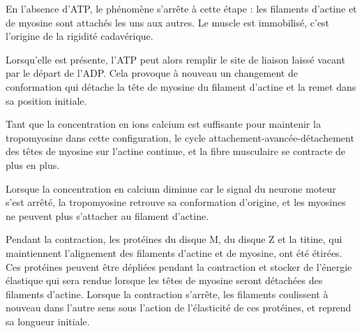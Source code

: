 En l'absence d'ATP, le phénomène s'arrête à cette étape : les filaments d'actine et de myosine sont attachés les uns aux autres. Le muscle est immobilisé, c'est l'origine de la rigidité cadavérique. 

Lorsqu'elle est présente, l'ATP peut alors remplir le site de liaison laissé vacant par le départ de l'ADP. Cela provoque à nouveau un changement de conformation qui détache la tête de myosine du filament d'actine et la remet dans sa position initiale.

Tant que la concentration en ions calcium est suffisante pour maintenir la tropomyosine dans cette configuration, le cycle attachement-avancée-détachement des têtes de myosine sur l'actine continue, et la fibre musculaire se contracte de plus en plus. 

Lorsque la concentration en calcium diminue car le signal du neurone moteur s'est arrêté, la tropomyosine retrouve sa conformation d'origine, et les myosines ne peuvent plus s'attacher au filament d'actine. 

Pendant la contraction, les protéines du disque M, du disque Z et la titine, qui maintiennent l'alignement des filaments d'actine et de myosine, ont été étirées. Ces protéines peuvent être dépliées pendant la contraction et stocker de l'énergie élastique qui sera rendue lorsque les têtes de myosine seront détachées des filaments d'actine. Lorsque la contraction s'arrête, les filaments coulissent à nouveau dans l'autre sens sous l'action de l'élasticité de ces protéines, et reprend sa longueur initiale. 


